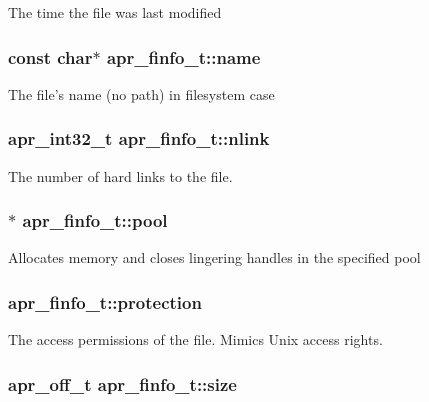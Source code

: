 The time the file was last modified \hypertarget{structapr__finfo__t_a2915f9141ea76ae3672ccf9eb0fa77bb}{
\subsubsection[{name}]{\setlength{\rightskip}{0pt plus 5cm}const char$\ast$ apr\-\_\-finfo\-\_\-t\-::name}}\label{structapr__finfo__t_a2915f9141ea76ae3672ccf9eb0fa77bb}
The file's name (no path) in filesystem case \hypertarget{structapr__finfo__t_a98598f28735d75aa0c1994efc825e6d9}{
\subsubsection[{nlink}]{\setlength{\rightskip}{0pt plus 5cm}apr\-\_\-int32\-\_\-t apr\-\_\-finfo\-\_\-t\-::nlink}}\label{structapr__finfo__t_a98598f28735d75aa0c1994efc825e6d9}
The number of hard links to the file. \hypertarget{structapr__finfo__t_a71496f86b5489c87e58e9c03fe468fb8}{
\subsubsection[{pool}]{$\ast$ apr\-\_\-finfo\-\_\-t\-::pool}}\label{structapr__finfo__t_a71496f86b5489c87e58e9c03fe468fb8}
Allocates memory and closes lingering handles in the specified pool \hypertarget{structapr__finfo__t_a7c09d73ad1957e2c0e6c6b77d94e90ab}{
\subsubsection[{protection}]{ apr\-\_\-finfo\-\_\-t\-::protection}}\label{structapr__finfo__t_a7c09d73ad1957e2c0e6c6b77d94e90ab}
The access permissions of the file. Mimics Unix access rights. \hypertarget{structapr__finfo__t_a3e47a673c5b82a25a783a732dee6f946}{
\subsubsection[{size}]{\setlength{\rightskip}{0pt plus 5cm}apr\-\_\-off\-\_\-t apr\-\_\-finfo\-\_\-t\-::size}}\label{structapr__finfo__t_a3e47a673c5b82a25a783a732dee6f946}
